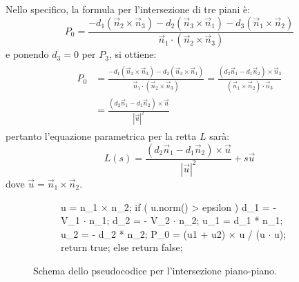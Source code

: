 Nello specifico, la formula per l'intersezione di tre piani è:
\begin{equation}
P_0 =  \frac{-d_1(\vec{n}_2 \times \vec{n}_3) - d_2(\vec{n}_3 \times \vec{n}_1) - d_3(\vec{n}_1 \times \vec{n}_2)}{\vec{n}_1 \cdot (\vec{n}_2 \times \vec{n}_3)}
\end{equation}
e ponendo $d_3 = 0$ per $P_3$, si ottiene:
\begin{equation}
\begin{split}
\begin{aligned}
P_0 &=  \frac{-d_1(\vec{n}_2 \times \vec{n}_3) - d_2(\vec{n}_3 \times \vec{n}_1)}{\vec{n}_1 \cdot (\vec{n}_2 \times \vec{n}_3)}
=
\frac{(d_2\vec{n}_1 - d_1\vec{n}_2) \times \vec{n}_3}{(\vec{n}_1 \times \vec{n}_2) \cdot \vec{n}_3}\\
&=
\frac{(d_2\vec{n}_1 - d_1\vec{n}_2) \times \vec{u}}{|\vec{u}|^2}
\end{aligned}
\end{split}
\end{equation}
pertanto l'equazione parametrica per la retta $L$ sarà:
\begin{equation}
L(s) =
\frac{(d_2\vec{n}_1 - d_1\vec{n}_2) \times \vec{u}}{|\vec{u}|^2}+s\vec{u}
\end{equation}
dove $\vec{u}=\vec{n}_1 \times \vec{n}_2$.

\begin{figure}[htbp]
	\centering
	\begin{subfigure}{.65\linewidth}
		\begin{pseudoc}
	u = n_1 $\times$ n_2;
	if ( u.norm() > epsilon ) {
		d_1 = - V_1 $\cdot$ n_1;
		d_2 = - V_2 $\cdot$ n_2;
		u_1 = d_1 * n_1;
		u_2 = - d_2 * n_2;
		P_0 = (u1 + u2) $\times$ u / (u $\cdot$ u);
		return true;
	} else {
		return false;
	}
		\end{pseudoc}
	\end{subfigure}
	\caption{Schema dello pseudocodice per l'intersezione piano-piano.}
\end{figure}
%
